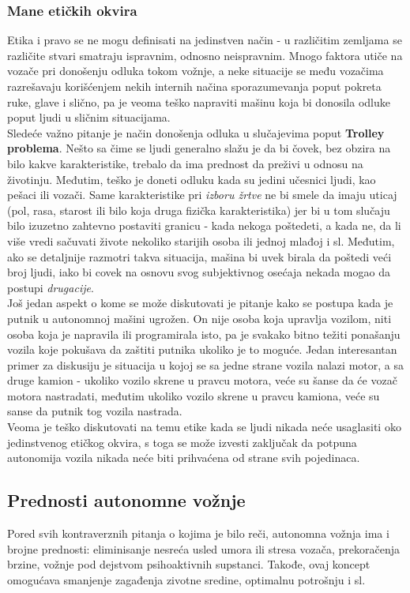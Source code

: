 \documentclass[a4paper]{article}
\begin{document}
\subsubsection{Mane etičkih okvira}
\label{subsubsec:Mane etičkih okvira}
Etika i pravo se ne mogu definisati na jedinstven način - u različitim zemljama se različite stvari smatraju ispravnim, odnosno neispravnim. Mnogo faktora utiče na vozače pri donošenju odluka tokom vožnje, a neke situacije se među vozačima razrešavaju korišćenjem nekih internih načina sporazumevanja poput pokreta ruke, glave i slično, pa je veoma teško napraviti mašinu koja bi donosila odluke poput ljudi u sličnim situacijama. \\
Sledeće važno pitanje je način donošenja odluka u slučajevima poput \textbf{Trolley problema}. Nešto sa čime se ljudi generalno slažu je da bi čovek, bez obzira na bilo kakve karakteristike, trebalo da ima prednost da preživi u odnosu na životinju. Međutim, teško je doneti odluku kada su jedini učesnici ljudi, kao pešaci ili vozači. Same karakteristike pri \emph{izboru žrtve} ne bi smele da imaju uticaj (pol, rasa, starost ili bilo koja druga fizička karakteristika) jer bi u tom slučaju bilo izuzetno zahtevno postaviti granicu - kada nekoga poštedeti, a kada ne, da li više vredi sačuvati živote nekoliko starijih osoba ili jednoj mlađoj i sl. Međutim, ako se detaljnije razmotri takva situacija, mašina bi uvek birala da poštedi veći broj ljudi, iako bi covek na osnovu svog subjektivnog osećaja nekada mogao da postupi \emph{drugacije}. \\
Još jedan aspekt o kome se može diskutovati je pitanje kako se postupa kada je putnik u autonomnoj mašini ugrožen. On nije osoba koja upravlja vozilom, niti osoba koja je napravila ili programirala isto, pa je svakako bitno težiti ponašanju vozila koje pokušava da zaštiti putnika ukoliko je to moguće. Jedan interesantan primer za diskusiju je situacija u kojoj se sa jedne strane vozila nalazi motor, a sa druge kamion - ukoliko vozilo skrene u pravcu motora, veće su šanse da će vozač motora nastradati, međutim ukoliko vozilo skrene u pravcu kamiona, veće su sanse da putnik tog vozila nastrada. \\
Veoma je teško diskutovati na temu etike kada se ljudi nikada neće usaglasiti oko jedinstvenog etičkog okvira, s toga se može izvesti zaključak da potpuna autonomija vozila nikada neće biti prihvaćena od strane svih pojedinaca.

\subsection{Prednosti autonomne vožnje}
\label{subsec:Prednosti autonomne vožnje}
Pored svih kontraverznih pitanja o kojima je bilo reči, autonomna vožnja ima i brojne prednosti: eliminisanje nesreća usled umora ili stresa vozača, prekoračenja brzine, vožnje pod dejstvom psihoaktivnih supstanci. Takođe, ovaj koncept omogućava smanjenje zagađenja zivotne sredine, optimalnu potrošnju i sl.
\end{document}
